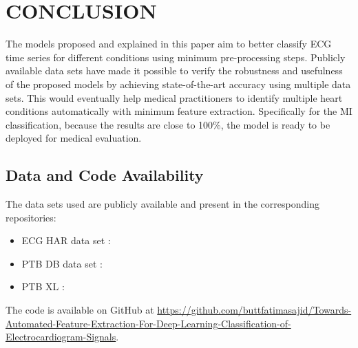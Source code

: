 \documentclass{ieeeaccess}
\begin{document}
\vspace{6pt} 

\section{CONCLUSION}

The models proposed and explained in this paper aim to better classify ECG time series for different conditions using minimum pre-processing steps. Publicly available data sets have made it possible to verify the robustness and usefulness of the proposed models by achieving state-of-the-art accuracy using multiple data sets. This would eventually help medical practitioners to identify multiple heart conditions automatically with minimum feature extraction. Specifically for the MI classification, because the results are close to 100\%, the model is ready to be deployed for medical evaluation. 


\appendices
\appendix 
\subsection{Data and Code Availability}
The data sets used are publicly available and present in the corresponding repositories:
\begin{itemize}
\item ECG HAR data set : \cite{ info12020063-20}
\item PTB DB data set : \cite{ptb}
\item PTB XL : \cite{ptbxl}
\end{itemize}

The code is available on GitHub at \url{https://github.com/buttfatimasajid/Towards-Automated-Feature-Extraction-For-Deep-Learning-Classification-of-Electrocardiogram-Signals}.
\end{document}
